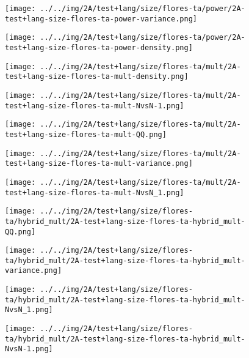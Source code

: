 \begin{figure}[H]
\centering	\texttt{[image: ../../img/2A/test+lang/size/flores-ta/power/2A-test+lang-size-flores-ta-power-variance.png]}
\end{figure}
\begin{figure}[H]
\centering	\texttt{[image: ../../img/2A/test+lang/size/flores-ta/power/2A-test+lang-size-flores-ta-power-density.png]}
\end{figure}
\begin{figure}[H]
\centering	\texttt{[image: ../../img/2A/test+lang/size/flores-ta/mult/2A-test+lang-size-flores-ta-mult-density.png]}
\end{figure}
\begin{figure}[H]
\centering	\texttt{[image: ../../img/2A/test+lang/size/flores-ta/mult/2A-test+lang-size-flores-ta-mult-NvsN-1.png]}
\end{figure}
\begin{figure}[H]
\centering	\texttt{[image: ../../img/2A/test+lang/size/flores-ta/mult/2A-test+lang-size-flores-ta-mult-QQ.png]}
\end{figure}
\begin{figure}[H]
\centering	\texttt{[image: ../../img/2A/test+lang/size/flores-ta/mult/2A-test+lang-size-flores-ta-mult-variance.png]}
\end{figure}
\begin{figure}[H]
\centering	\texttt{[image: ../../img/2A/test+lang/size/flores-ta/mult/2A-test+lang-size-flores-ta-mult-NvsN\_1.png]}
\end{figure}
\begin{figure}[H]
\centering	\texttt{[image: ../../img/2A/test+lang/size/flores-ta/hybrid\_mult/2A-test+lang-size-flores-ta-hybrid\_mult-QQ.png]}
\end{figure}
\begin{figure}[H]
\centering	\texttt{[image: ../../img/2A/test+lang/size/flores-ta/hybrid\_mult/2A-test+lang-size-flores-ta-hybrid\_mult-variance.png]}
\end{figure}
\begin{figure}[H]
\centering	\texttt{[image: ../../img/2A/test+lang/size/flores-ta/hybrid\_mult/2A-test+lang-size-flores-ta-hybrid\_mult-NvsN\_1.png]}
\end{figure}
\begin{figure}[H]
\centering	\texttt{[image: ../../img/2A/test+lang/size/flores-ta/hybrid\_mult/2A-test+lang-size-flores-ta-hybrid\_mult-NvsN-1.png]}
\end{figure}
